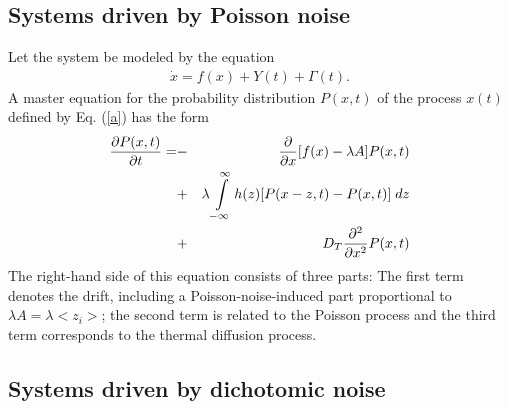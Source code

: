 \documentclass[authoryear,draft,1p,times]{elsarticle}
\renewcommand{\=}{\stackrel{\mathrm{d}}{=}}
\begin{document}

\subsection{Systems driven by Poisson noise}


Let the system be  modeled by the equation  
%
\begin{eqnarray} \label{a}
\dot x = f(x)  + Y(t) + \Gamma (t).
\end{eqnarray}
%
A master equation for the probability distribution $P(x, t) $ of the process
$x(t)$ defined by Eq. (\ref{a}) has the form  
%
\begin{eqnarray} \label{mas}
 {\partial P(x, t) \over \partial t} =&-&{\partial\over \partial x}
[f(x)-\lambda A]P(x, t)  \nonumber \\
&+&\lambda \int\limits_{- \infty}^{\infty} h(z)[P(x-z, t)-P(x, t) ]\; dz
\nonumber\\
&+&D_T {\partial^2 \over \partial x^2} P(x, t)
\end{eqnarray}
%
The right-hand side of this equation consists of three
parts: The first term denotes the drift, including a Poisson-noise-induced part
proportional to $\lambda A = \lambda <z_i>$;
the second term is related to the Poisson process  and
the third term corresponds to the thermal diffusion process.



\subsection{Systems driven by dichotomic noise }
\end{document}

